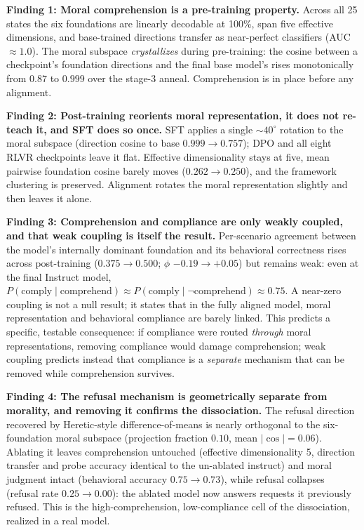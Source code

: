 \textbf{Finding 1: Moral comprehension is a pre-training property.} Across all 25
states the six foundations are linearly decodable at 100\%, span five effective
dimensions, and base-trained directions transfer as near-perfect classifiers
(AUC \(\approx 1.0\)). The moral subspace \emph{crystallizes} during pre-training:
the cosine between a checkpoint's foundation directions and the final base
model's rises monotonically from \(0.87\) to \(0.999\) over the stage-3 anneal.
Comprehension is in place before any alignment.

\textbf{Finding 2: Post-training reorients moral representation, it does not re-teach
it, and SFT does so once.} SFT applies a
single \({\sim}40^{\circ}\) rotation to the moral subspace (direction cosine to base
\(0.999 \rightarrow 0.757\)); DPO and all eight RLVR checkpoints leave it flat.
Effective dimensionality stays at five, mean pairwise foundation cosine barely
moves (\(0.262 \rightarrow 0.250\)), and the framework clustering is preserved.
Alignment rotates the moral representation slightly and then leaves it alone.

\textbf{Finding 3: Comprehension and compliance are only weakly coupled, and that weak
coupling is itself the result.} Per-scenario
agreement between the model's internally dominant foundation and its behavioral
correctness rises across post-training (\(0.375 \rightarrow 0.500\); \(\phi\)
\(-0.19 \rightarrow +0.05\)) but remains weak: even at the final Instruct model,
\(P(\text{comply} \mid \text{comprehend}) \approx P(\text{comply} \mid
\neg\text{comprehend}) \approx 0.75\). A near-zero coupling is not a null result;
it states that in the fully aligned model, moral representation and behavioral
compliance are barely linked. This predicts a specific, testable consequence:
if compliance were routed \emph{through} moral representations, removing compliance
would damage comprehension; weak coupling predicts instead that compliance is a
\emph{separate} mechanism that can be removed while comprehension survives.

\textbf{Finding 4: The refusal mechanism is geometrically separate from morality, and
removing it confirms the dissociation.} The refusal direction recovered by
Heretic-style difference-of-means \citep{arditi2024refusal} is nearly orthogonal
to the six-foundation moral subspace (projection fraction \(0.10\), mean
\(|\cos| = 0.06\)). Ablating it leaves comprehension untouched (effective
dimensionality 5, direction transfer and probe accuracy identical to the
un-ablated instruct) and moral judgment intact (behavioral accuracy
\(0.75 \rightarrow 0.73\)), while refusal collapses (refusal rate
\(0.25 \rightarrow 0.00\)): the ablated model now answers requests it previously
refused. This is the high-comprehension, low-compliance cell of the
dissociation, realized in a real model.

